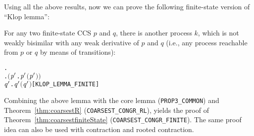 Using all the above results, now we can prove the following finite-state
version of ``Klop lemma'':
\begin{lemma}
\label{lem:klop-lemma-finite}
For any two finite-state CCS $p$ and $q$, there is another process
$k$, which is not weakly bisimilar 
with any weak derivative  of $p$
and $q$ (i.e., any process reachable from $p$ or $q$ by means of transitions):
\begin{alltt}
\HOLTokenTurnstile{} \HOLSymConst{\HOLTokenForall{}} .
       \HOLSymConst{\HOLTokenConj{}}   \HOLSymConst{\HOLTokenImp{}}
     \HOLSymConst{\HOLTokenExists{}}.   \HOLSymConst{\HOLTokenConj{}} \ensuremath{(}\HOLSymConst{\HOLTokenForall{}}\ensuremath{\HOLBoundVar{p}\sp{\prime{}}} .  \HOLTokenWeakTransBegin{}\HOLTokenWeakTransEnd \ensuremath{\HOLBoundVar{p}\sp{\prime{}}} \HOLSymConst{\HOLTokenImp{}} \HOLSymConst{\HOLTokenNeg{}}\ensuremath{(}\ensuremath{\HOLBoundVar{p}\sp{\prime{}}} \HOLSymConst{\HOLTokenWeakEQ} \ensuremath{)}\ensuremath{)} \HOLSymConst{\HOLTokenConj{}}
         \HOLSymConst{\HOLTokenForall{}}\ensuremath{\HOLBoundVar{q}\sp{\prime{}}} .  \HOLTokenWeakTransBegin{}\HOLTokenWeakTransEnd \ensuremath{\HOLBoundVar{q}\sp{\prime{}}} \HOLSymConst{\HOLTokenImp{}} \HOLSymConst{\HOLTokenNeg{}}\ensuremath{(}\ensuremath{\HOLBoundVar{q}\sp{\prime{}}} \HOLSymConst{\HOLTokenWeakEQ} \ensuremath{)}\hfill{[KLOP_LEMMA_FINITE]}
\end{alltt}
\end{lemma}
Combining the above lemma with the core lemma
(\texttt{PROP3_COMMON}) and Theorem~\ref{thm:coarsestR} (\texttt{COARSEST_CONGR_RL}),
yields the proof of Theorem~\ref{thm:coarsestfiniteState}
(\texttt{COARSEST_CONGR_FINITE}). The same proof idea can also be used with
 contraction and rooted contraction. %

